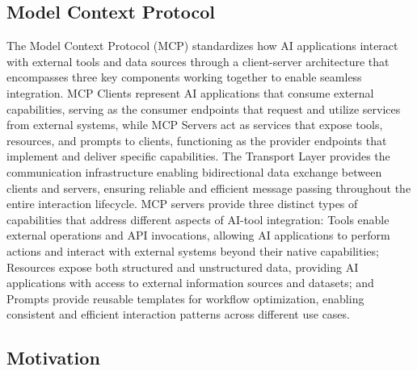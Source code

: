 \documentclass[11pt]{article}
\begin{document}
\subsection{Model Context Protocol}

The Model Context Protocol (MCP) standardizes how AI applications interact with external tools and data sources through a client-server architecture that encompasses three key components working together to enable seamless integration. MCP Clients represent AI applications that consume external capabilities, serving as the consumer endpoints that request and utilize services from external systems, while MCP Servers act as services that expose tools, resources, and prompts to clients, functioning as the provider endpoints that implement and deliver specific capabilities. The Transport Layer provides the communication infrastructure enabling bidirectional data exchange between clients and servers, ensuring reliable and efficient message passing throughout the entire interaction lifecycle. MCP servers provide three distinct types of capabilities that address different aspects of AI-tool integration: Tools enable external operations and API invocations, allowing AI applications to perform actions and interact with external systems beyond their native capabilities; Resources expose both structured and unstructured data, providing AI applications with access to external information sources and datasets; and Prompts provide reusable templates for workflow optimization, enabling consistent and efficient interaction patterns across different use cases.

\subsection{Motivation}
\end{document}
